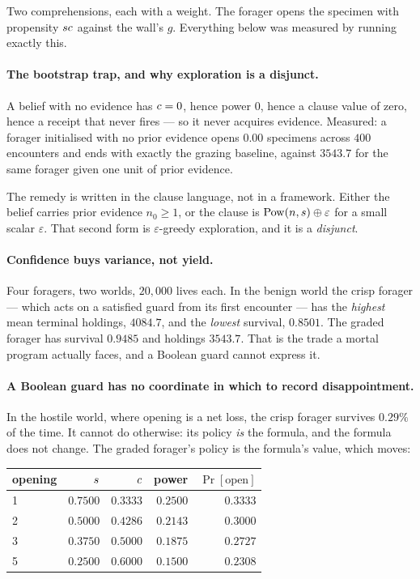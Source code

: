 Two comprehensions, each with a weight. The forager opens the specimen with
propensity $sc$ against the wall's $g$. Everything below was measured by
running exactly this.

\paragraph{The bootstrap trap, and why exploration is a disjunct.} A belief with
no evidence has $c = 0$, hence power $0$, hence a clause value of zero, hence
a receipt that never fires --- so it never acquires evidence. Measured: a forager
initialised with no prior evidence opens $0.00$ specimens across $400$
encounters and ends with exactly the grazing baseline, against $3543.7$ for the
same forager given one unit of prior evidence.

The remedy is written in the clause language, not in a framework. Either the
belief carries prior evidence $n_0 \geq 1$, or the clause is
$\mathrm{Pow}(n,s) \oplus \varepsilon$ for a small scalar $\varepsilon$. That
second form is $\varepsilon$-greedy exploration, and it is a \emph{disjunct}.

\paragraph{Confidence buys variance, not yield.} Four foragers, two worlds,
$20{,}000$ lives each. In the benign world the crisp forager --- which acts on a
satisfied guard from its first encounter --- has the \emph{highest} mean terminal
holdings, $4084.7$, and the \emph{lowest} survival, $0.8501$. The graded forager
has survival $0.9485$ and holdings $3543.7$. That is the trade a mortal program
actually faces, and a Boolean guard cannot express it.

\paragraph{A Boolean guard has no coordinate in which to record disappointment.}
In the hostile world, where opening is a net loss, the crisp forager survives
$0.29\%$ of the time. It cannot do otherwise: its policy \emph{is} the formula,
and the formula does not change. The graded forager's policy is the formula's
value, which moves:

\begin{center}
\small
\begin{tabular}{@{}lrrrr@{}}
\toprule
opening & $s$ & $c$ & power & $\Pr[\text{open}]$ \\
\midrule
1 & $0.7500$ & $0.3333$ & $0.2500$ & $0.3333$ \\
2 & $0.5000$ & $0.4286$ & $0.2143$ & $0.3000$ \\
3 & $0.3750$ & $0.5000$ & $0.1875$ & $0.2727$ \\
5 & $0.2500$ & $0.6000$ & $0.1500$ & $0.2308$ \\
\bottomrule
\end{tabular}
\end{center}


